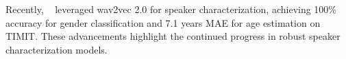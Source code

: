 Recently, ~\citet{burkhardt2023speechbasedagegenderprediction} leveraged wav2vec 2.0 for speaker characterization, achieving 100\% accuracy for gender classification and 7.1 years MAE for age estimation on TIMIT. These advancements highlight the continued progress in robust speaker characterization models.